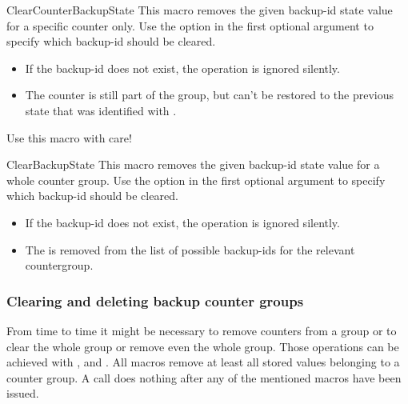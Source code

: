 \documentclass[12pt,a4paper,oneside]{article}
\makeatletter
\newcommand{\chdocextractversion}[1]{%
  \@nameuse{#1}%
}
\newcommand{\CHDocNew}[1]{%
  \tcbdocmarginnote[doclang/new={N},
  colframe=blue,
  halign=left,
  colback={blue!20!white},
  fontupper={\tiny}
  ]{%
    \chdocextractversion{xassoccntversion#1}%
  }%
}
\makeatother
\begin{document}
\begin{docCommand}[before={\CHDocNew{1.0}}]{ClearCounterBackupState}{}
  This macro removes the given backup-id state value for a specific counter only. Use the  option in the first optional argument to specify which backup-id should be cleared. 

  \begin{itemize}
  \item If the backup-id does not exist, the operation is ignored silently.
  \item The counter is still part of the group, but can't be restored to the previous state that was identified with .
  \end{itemize}

  \marginnote{\bcbombe}Use this macro with care!
  \smallskip
\end{docCommand}


\begin{docCommand}[before={\CHDocNew{1.0}}]{ClearBackupState}{}
  This macro removes the given backup-id state value for a whole counter group. Use the  option in the first optional argument to specify which backup-id should be cleared. 

  \begin{itemize}
  \item If the backup-id does not exist, the operation is ignored silently.
  \item The  is removed from the list of possible backup-ids for the relevant countergroup. 
  \end{itemize}
\end{docCommand}




\subsubsection[Clearing backup groups]{Clearing and deleting backup counter groups}\label{subsubsec::clearingdeletingbackupcountergroups}

From time to time it might be necessary to remove counters from a group or to clear the whole group or remove even the whole group. Those operations can be achieved with ,  and . All macros remove at least all stored values belonging to a counter group. A  call does nothing after any of the mentioned macros have been issued. 
\end{document}

